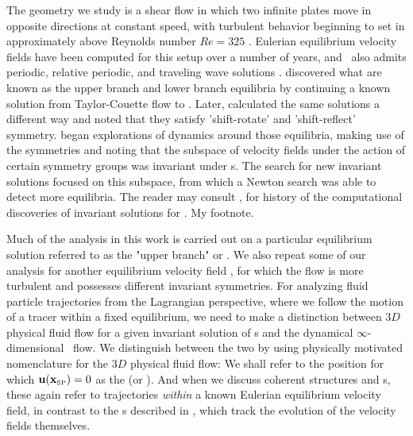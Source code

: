 The {\pC} geometry we study is a shear flow in which two infinite 
plates move in opposite directions at constant speed, with turbulent 
behavior beginning to set in approximately above Reynolds number $Re=325$ 
\citep{GHCV08}. Eulerian equilibrium velocity fields have been computed 
for this setup over a number of years, and \pCf\ also admits periodic, 
relative periodic, and traveling wave solutions \citep{GHCV08,DV04}. 
\citet{N90} discovered what are known as the upper branch and 
lower branch equilibria by continuing a known solution from 
Taylor-Couette flow to {\pC}. Later, %
\citet{W03} 
calculated the same solutions a different way and noted that they satisfy 
'shift-rotate' and 'shift-reflect' symmetry. 
\citet{GHCW07} 
began explorations of {\pC} dynamics around those equilibria, 
making use of the symmetries and noting that the subspace of velocity 
fields under the action of certain symmetry groups was invariant under 
{\NSe}s. The search for new invariant solutions focused on this 
subspace, from which a Newton search was able to detect more equilibria. 
The reader may consult \citet{GHCV08}, \citet{GHCW07} for 
history of the computational discoveries of invariant solutions for 
{\pCf}. 
 {My footnote.}

Much of the analysis in this work is carried out on a particular 
equilibrium solution referred to as the "upper branch" or {\tEQtwo}. We also 
repeat some of our analysis  for another equilibrium velocity field 
{\tEQeight}, for which the flow is more turbulent and possesses different 
invariant symmetries. For analyzing fluid particle trajectories from the 
Lagrangian perspective, where we follow the motion of a tracer within a 
fixed equilibrium,  we need to make a distinction between $3D$ physical 
fluid flow for a given invariant solution of {\NSe}s and the dynamical 
$\infty$-dimensional \statesp\ flow. We distinguish between the two by 
using physically motivated nomenclature for the $3D$ physical fluid flow: 
We shall refer to the position for which $\bu(\xSP{})=0$ as the {\em 
\stagp} \xSP{} (or \tSP{}). And when we discuss coherent 
structures and {\hc}s, these again refer to trajectories \emph{within} 
a known Eulerian equilibrium velocity field, in contrast to the {\hc}s 
described in \citet{GHCV08}, which track the evolution of the 
velocity fields themselves. 

